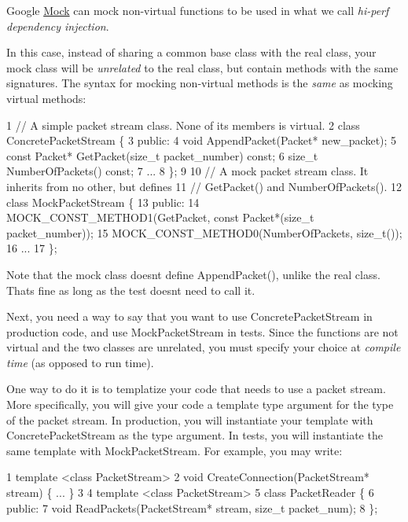 Google \hyperlink{classMock}{Mock} can mock non-\/virtual functions to be used in what we call {\itshape hi-\/perf dependency injection}.

In this case, instead of sharing a common base class with the real class, your mock class will be {\itshape unrelated} to the real class, but contain methods with the same signatures. The syntax for mocking non-\/virtual methods is the {\itshape same} as mocking virtual methods\+:


\begin{DoxyCode}
1 // A simple packet stream class.  None of its members is virtual.
2 class ConcretePacketStream \{
3  public:
4   void AppendPacket(Packet* new\_packet);
5   const Packet* GetPacket(size\_t packet\_number) const;
6   size\_t NumberOfPackets() const;
7   ...
8 \};
9 
10 // A mock packet stream class.  It inherits from no other, but defines
11 // GetPacket() and NumberOfPackets().
12 class MockPacketStream \{
13  public:
14   MOCK\_CONST\_METHOD1(GetPacket, const Packet*(size\_t packet\_number));
15   MOCK\_CONST\_METHOD0(NumberOfPackets, size\_t());
16   ...
17 \};
\end{DoxyCode}


Note that the mock class doesn\textquotesingle{}t define {\ttfamily Append\+Packet()}, unlike the real class. That\textquotesingle{}s fine as long as the test doesn\textquotesingle{}t need to call it.

Next, you need a way to say that you want to use {\ttfamily Concrete\+Packet\+Stream} in production code, and use {\ttfamily Mock\+Packet\+Stream} in tests. Since the functions are not virtual and the two classes are unrelated, you must specify your choice at {\itshape compile time} (as opposed to run time).

One way to do it is to templatize your code that needs to use a packet stream. More specifically, you will give your code a template type argument for the type of the packet stream. In production, you will instantiate your template with {\ttfamily Concrete\+Packet\+Stream} as the type argument. In tests, you will instantiate the same template with {\ttfamily Mock\+Packet\+Stream}. For example, you may write\+:


\begin{DoxyCode}
1 template <class PacketStream>
2 void CreateConnection(PacketStream* stream) \{ ... \}
3 
4 template <class PacketStream>
5 class PacketReader \{
6  public:
7   void ReadPackets(PacketStream* stream, size\_t packet\_num);
8 \};
\end{DoxyCode}


